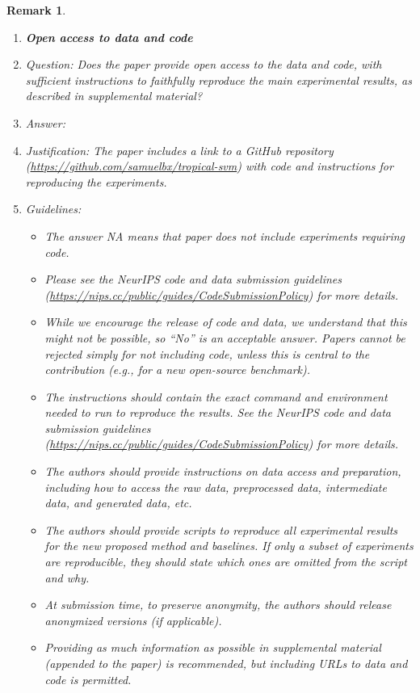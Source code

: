 \documentclass{article}
\newtheorem{remark}{Remark}
\begin{document}
\begin{remark}
\begin{enumerate}
\item {\bf Open access to data and code}
    \item[] Question: Does the paper provide open access to the data and code, with sufficient instructions to faithfully reproduce the main experimental results, as described in supplemental material?
    \item[] Answer: \answerYes{}
    \item[] Justification: The paper includes a link to a GitHub repository (\url{https://github.com/samuelbx/tropical-svm}) with code and instructions for reproducing the experiments.
    \item[] Guidelines:
    \begin{itemize}
        \item The answer NA means that paper does not include experiments requiring code.
        \item Please see the NeurIPS code and data submission guidelines (\url{https://nips.cc/public/guides/CodeSubmissionPolicy}) for more details.
        \item While we encourage the release of code and data, we understand that this might not be possible, so “No” is an acceptable answer. Papers cannot be rejected simply for not including code, unless this is central to the contribution (e.g., for a new open-source benchmark).
        \item The instructions should contain the exact command and environment needed to run to reproduce the results. See the NeurIPS code and data submission guidelines (\url{https://nips.cc/public/guides/CodeSubmissionPolicy}) for more details.
        \item The authors should provide instructions on data access and preparation, including how to access the raw data, preprocessed data, intermediate data, and generated data, etc.
        \item The authors should provide scripts to reproduce all experimental results for the new proposed method and baselines. If only a subset of experiments are reproducible, they should state which ones are omitted from the script and why.
        \item At submission time, to preserve anonymity, the authors should release anonymized versions (if applicable).
        \item Providing as much information as possible in supplemental material (appended to the paper) is recommended, but including URLs to data and code is permitted.
    \end{itemize}



\end{enumerate}
\end{remark}
\end{document}
